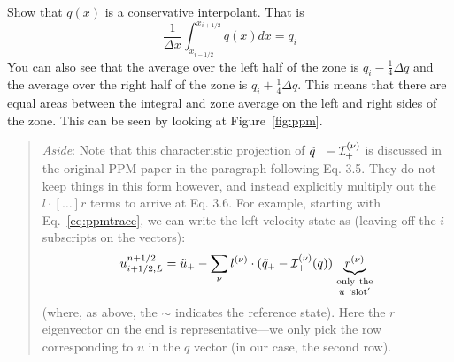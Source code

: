 \begin{exercise}
{Show that $q(x)$ is a conservative interpolant.  That is
\begin{equation}
\frac{1}{\Delta x} \int_{x_{i-1/2}}^{x_{i+1/2}} q(x) dx = q_i
\end{equation}
You can also see that the average over the left half of the zone is
$q_i -\frac{1}{4}\Delta q$ and the average over the right half of the
zone is $q_i + \frac{1}{4}\Delta q$.  This means that there are equal
areas between the integral and zone average on the left and right
sides of the zone.  This can be seen by looking at
Figure~\ref{fig:ppm}.  }
\end{exercise}

\begin{quote}
\noindent\makebox[\linewidth]{\rule{0.9\textwidth}{1pt}}
{\em Aside}:
Note that this characteristic projection of $\tilde{q}_+ -
{\mathcal{I}}_+^{(\nu)}$ is discussed in the original PPM paper in the
paragraph following Eq. 3.5.  They do not keep things in this form
however, and instead explicitly multiply out the $l\cdot [\ldots] r$
terms to arrive at Eq. 3.6.  For example, starting with
Eq.~\ref{eq:ppmtrace},
we can write the left velocity state as (leaving off the $i$
subscripts on the vectors):
\begin{equation}
u_{i+1/2,L}^{n+1/2} =
  \tilde{u}_+ - \sum_\nu l^{(\nu)} \cdot
      ( \tilde{q}_+ -  {\mathcal{I}}_+^{(\nu)}(q) )
    \underbrace{r^{(\nu)}}_{\begin{smallmatrix}\mathrm{only~the}\\ u~\mathrm{`slot'} \end{smallmatrix}}
\end{equation}
(where, as above, the $\sim$ indicates the reference state).
Here the $r$ eigenvector on the end is representative---we only pick
the row corresponding to $u$ in the $q$ vector (in our case, the
second row).


\end{quote}

